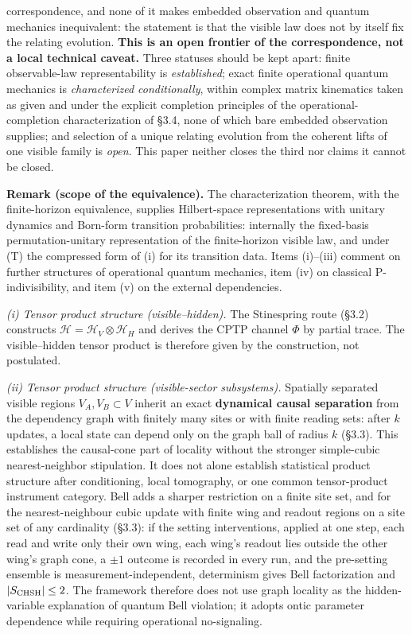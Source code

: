 \documentclass[
]{article}
\begin{document}
correspondence, and none of it makes embedded observation and quantum
mechanics inequivalent: the statement is that the visible law does not
by itself fix the relating evolution. \textbf{This is an open frontier
of the correspondence, not a local technical caveat.} Three statuses
should be kept apart: finite observable-law representability is
\emph{established}; exact finite operational quantum mechanics is
\emph{characterized conditionally}, within complex matrix kinematics
taken as given and under the explicit completion principles of the
operational-completion characterization of §3.4, none of which bare
embedded observation supplies; and selection of a unique relating
evolution from the coherent lifts of one visible family is \emph{open}.
This paper neither closes the third nor claims it cannot be closed.

\textbf{Remark (scope of the equivalence).} The characterization
theorem, with the finite-horizon equivalence, supplies Hilbert-space
representations with unitary dynamics and Born-form transition
probabilities: internally the fixed-basis permutation-unitary
representation of the finite-horizon visible law, and under (T) the
compressed form of (i) for its transition data. Items (i)--(iii) comment
on further structures of operational quantum mechanics, item (iv) on
classical P-indivisibility, and item (v) on the external dependencies.

\emph{(i) Tensor product structure (visible--hidden).} The Stinespring
route (§3.2) constructs
\(\mathcal{H} = \mathcal{H}_V \otimes \mathcal{H}_H\) and derives the
CPTP channel \(\Phi\) by partial trace. The visible--hidden tensor
product is therefore given by the construction, not postulated.

\emph{(ii) Tensor product structure (visible-sector subsystems).}
Spatially separated visible regions \(V_A,V_B\subset V\) inherit an
exact \textbf{dynamical causal separation} from the dependency graph
with finitely many sites or with finite reading sets: after \(k\)
updates, a local state can depend only on the graph ball of radius \(k\)
(§3.3). This establishes the causal-cone part of locality without the
stronger simple-cubic nearest-neighbor stipulation. It does not alone
establish statistical product structure after conditioning, local
tomography, or one common tensor-product instrument category. Bell adds
a sharper restriction on a finite site set, and for the
nearest-neighbour cubic update with finite wing and readout regions on a
site set of any cardinality (§3.3): if the setting interventions,
applied at one step, each read and write only their own wing, each
wing's readout lies outside the other wing's graph cone, a \(\pm1\)
outcome is recorded in every run, and the pre-setting ensemble is
measurement-independent, determinism gives Bell factorization and
\(|S_{\rm CHSH}|\le2\). The framework therefore does not use graph
locality as the hidden-variable explanation of quantum Bell violation;
it adopts ontic parameter dependence while requiring operational
no-signaling.
\end{document}
